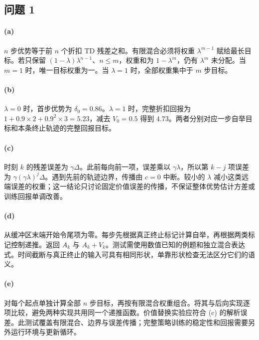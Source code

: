 \subsection*{问题 1}
\paragraph{(a)}\label{sol:gae-a}
$n$ 步优势等于前 $n$ 个折扣 TD 残差之和。有限混合必须将权重 $\lambda^{m-1}$ 赋给最长目标。若只保留 $(1-\lambda)\lambda^{n-1}$、$n\leq m$，权重和为 $1-\lambda^m$，仍有 $\lambda^m$ 未分配。当 $m=1$ 时，唯一目标权重为一。当 $\lambda=1$ 时，全部权重集中于 $m$ 步目标。

\paragraph{(b)}\label{sol:gae-b}
$\lambda=0$ 时，首步优势为 $\delta_0=0.86$。$\lambda=1$ 时，完整折扣回报为 $1+0.9\times2+0.9^2\times3=5.23$，减去 $V_0=0.5$ 得到 $4.73$。两者分别对应一步自举目标和本条终止轨迹的完整回报目标。

\paragraph{(c)}\label{sol:gae-c}
时刻 $k$ 的残差误差为 $\gamma\Delta$。此前每向前一项，误差乘以 $\gamma\lambda$，所以第 $k-j$ 项误差为 $\gamma(\gamma\lambda)^j\Delta$。遇到先前的轨迹边界，传播由 $c=0$ 中断。较小的 $\lambda$ 减小这类远端误差的权重；这一结论只讨论固定价值误差的传播，不保证整体优势估计方差或训练回报单调改善。

\paragraph{(d)}\label{sol:gae-d}
从缓冲区末端开始令尾项为零。每步先根据真正终止标记计算自举，再根据两类标记控制递推。返回 $A_k$ 与 $A_k+V_k$。测试需使用数值已知的例题和独立混合表达式。时间截断与真正终止的输入可具有相同形状，单靠形状检查无法区分它们的语义。

\paragraph{(e)}\label{sol:gae-e}
对每个起点单独计算全部 $n$ 步目标，再按有限混合权重组合。将其与后向实现逐项比较，避免两种实现共用同一个递推函数。价值替换实验应符合 (c) 的解析误差。此测试覆盖有限混合、边界与误差传播；完整策略训练的稳定性和回报需要另外运行环境与更新循环。
